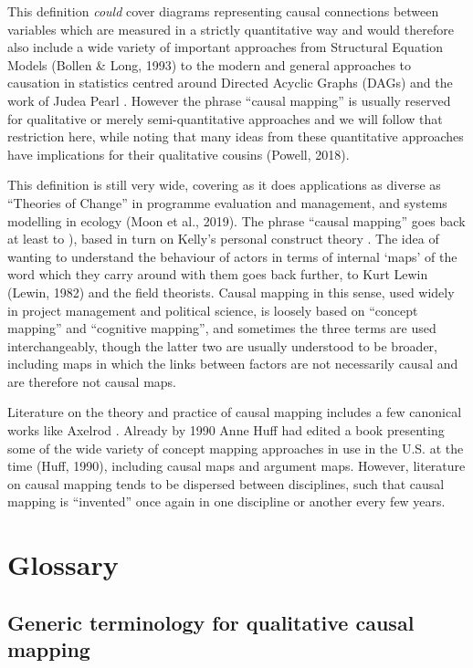 \documentclass[
]{book}
\begin{document}
This definition \emph{could} cover diagrams representing causal connections between variables which are measured in a strictly quantitative way and would therefore also include a wide variety of important approaches from Structural Equation Models (Bollen \& Long, 1993) to the modern and general approaches to causation in statistics centred around Directed Acyclic Graphs (DAGs) and the work of Judea Pearl \citep{pearl2018}. However the phrase ``causal mapping'' is usually reserved for qualitative or merely semi-quantitative approaches and we will follow that restriction here, while noting that many ideas from these quantitative approaches have implications for their qualitative cousins (Powell, 2018).

This definition is still very wide, covering as it does applications as diverse as ``Theories of Change'' in programme evaluation and management, and systems modelling in ecology (Moon et al., 2019). The phrase ``causal mapping'' goes back at least to \citep{axelrod2015}), based in turn on Kelly's personal construct theory \citep{kellyPersonalConstructTheory1955}. The idea of wanting to understand the behaviour of actors in terms of internal `maps' of the word which they carry around with them goes back further, to Kurt Lewin (Lewin, 1982) and the field theorists. Causal mapping in this sense, used widely in project management and political science, is loosely based on ``concept mapping'' and ``cognitive mapping'', and sometimes the three terms are used interchangeably, though the latter two are usually understood to be broader, including maps in which the links between factors are not necessarily causal and are therefore not causal maps.

Literature on the theory and practice of causal mapping includes a few canonical works like Axelrod \citep{axelrod2015}. Already by 1990 Anne Huff had edited a book presenting some of the wide variety of concept mapping approaches in use in the U.S. at the time (Huff, 1990), including causal maps and argument maps. However, literature on causal mapping tends to be dispersed between disciplines, such that causal mapping is ``invented'' once again in one discipline or another every few years.

\hypertarget{glossary}{%
\chapter{Glossary}\label{glossary}}

\hypertarget{generic-terminology-for-qualitative-causal-mapping}{%
\section{Generic terminology for qualitative causal mapping}\label{generic-terminology-for-qualitative-causal-mapping}}
\end{document}
